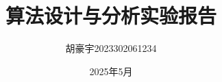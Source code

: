 \documentclass{article}  %
\begin{document}
\title{算法设计与分析实验报告}
\author{胡豪宇2023302061234}
\date{2025年5月}
\maketitle

\tableofcontents  %



\end{document}
